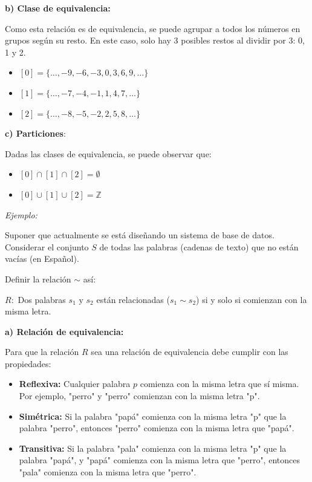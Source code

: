 \documentclass{article}
\begin{document}
\textbf{b) Clase de equivalencia:}

Como esta relación es de equivalencia, se puede agrupar a todos los números en grupos según su resto. En este caso, solo hay 3 posibles restos al dividir por 3: 0, 1 y 2.

\begin{itemize}
    \item $\left[0\right] = \{\dots, -9, -6, -3, 0, 3, 6, 9, \dots\}$
    \item $\left[1\right] = \{\dots, -7, -4, -1, 1, 4, 7, \dots\}$
    \item $\left[2\right] = \{\dots, -8, -5, -2, 2, 5, 8, \dots \}$
\end{itemize}

\textbf{c) Particiones}:

Dadas las clases de equivalencia, se puede observar que:

\begin{itemize}
    \item $\left[0\right] \cap \left[1\right] \cap \left[2\right] = \emptyset$
    \item $\left[0\right] \cup \left[1\right] \cup \left[2\right] = \mathbb{Z}$
\end{itemize}

\textit{Ejemplo:}

Suponer que actualmente se está diseñando un sistema de base de datos. Considerar el conjunto $S$ de todas las palabras (cadenas de texto) que no están vacías (en Español). 

Definir la relación $\sim$ así:

$R:$ Dos palabras $s_1 \text{ y } s_2$ están relacionadas ($s_1 \sim s_2$) si y solo si comienzan con la misma letra.

\textbf{a) Relación de equivalencia:}

Para que la relación $R$ sea una relación de equivalencia debe cumplir con las propiedades:

\begin{itemize}
    \item \textbf{Reflexiva:} Cualquier palabra $p$ comienza con la misma letra que sí misma. Por ejemplo, "perro" y "perro" comienzan con la misma letra "p".
    \item \textbf{Simétrica:} Si la palabra "papá" comienza con la misma letra "p" que la palabra "perro", entonces "perro" comienza con la misma letra que "papá".
    \item \textbf{Transitiva:} Si la palabra "pala" comienza con la misma letra "p" que la palabra "papá", y "papá" comienza con la misma letra que "perro", entonces "pala" comienza con la misma letra que "perro".
\end{itemize}
\end{document}
